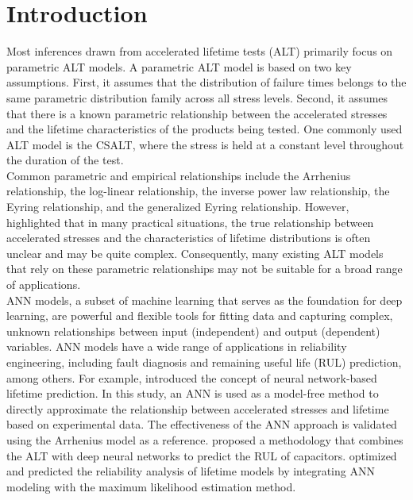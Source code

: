 \documentclass[twoside]{article}
\begin{document}
\section{Introduction}
Most inferences drawn from accelerated lifetime tests (ALT) primarily focus on parametric ALT models. A parametric ALT model is based on two key assumptions. First, it assumes that the distribution of failure times belongs to the same parametric distribution family across all stress levels. Second, it assumes that there is a known parametric relationship between the accelerated stresses and the lifetime characteristics of the products being tested. One commonly used ALT model is the CSALT, where the stress is held at a constant level throughout the duration of the test. \\
Common parametric and empirical relationships include the Arrhenius relationship, the log-linear relationship, the inverse power law relationship, the Eyring relationship, and the generalized Eyring relationship. However, \cite{Escobar:Meeker:2006} highlighted that in many practical situations, the true relationship between accelerated stresses and the characteristics of lifetime distributions is often unclear and may be quite complex. Consequently, many existing ALT models that rely on these parametric relationships may not be suitable for a broad range of applications.\\
ANN models, a subset of machine learning that serves as the foundation for deep learning, are powerful and flexible tools for fitting data and capturing complex, unknown relationships between input (independent) and output (dependent) variables. ANN models have a wide range of applications in reliability engineering, including fault diagnosis and remaining useful life (RUL) prediction, among others. For example, \cite{Freitag:2009} introduced the concept of neural network-based lifetime prediction. In this study, an ANN is used as a model-free method to directly approximate the relationship between accelerated stresses and lifetime based on experimental data. The effectiveness of the ANN approach is validated using the Arrhenius model as a reference. \cite{Jeong:2024} proposed a methodology that combines the ALT with deep neural networks to predict the RUL of capacitors. \cite{colak:2024} optimized and predicted the reliability analysis of lifetime models by integrating ANN modeling with the maximum likelihood estimation method.\\
\end{document}
